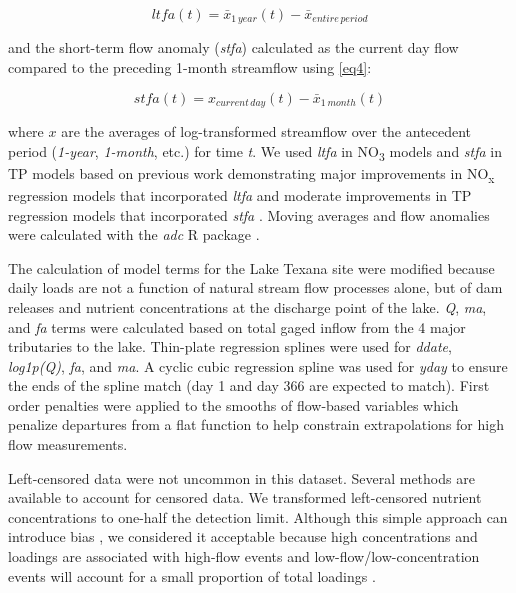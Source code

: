 \documentclass[sn-basic,referee,lineno,pdflatex]{sn-jnl}
\begin{document}
\begin{equation}
ltfa(t) = \bar{x}_{1\,year}(t) - \bar{x}_{entire\,period}
\label{eq3}
\end{equation}

and the short-term flow anomaly (\emph{stfa}) calculated as the current
day flow compared to the preceding 1-month streamflow using \ref{eq4}:

\begin{equation}
stfa(t) = x_{current\,day}(t) - \bar{x}_{1\,month}(t)
\label{eq4}
\end{equation}

where \(x\) are the averages of log-transformed streamflow over the
antecedent period (\emph{1-year}, \emph{1-month}, etc.) for time
\emph{t}. We used \emph{ltfa} in NO\textsubscript{3} models and
\emph{stfa} in TP models based on previous work demonstrating major
improvements in NO\textsubscript{x} regression models that incorporated
\emph{ltfa} and moderate improvements in TP regression models that
incorporated \emph{stfa} \citep{zhang_improving_2017}. Moving averages
and flow anomalies were calculated with the \emph{adc} R package
\citep{schrammAdcCalculateAntecedant2023}.

The calculation of model terms for the Lake Texana site were modified
because daily loads are not a function of natural stream flow processes
alone, but of dam releases and nutrient concentrations at the discharge
point of the lake. \emph{Q}, \emph{ma}, and \emph{fa} terms were
calculated based on total gaged inflow from the 4 major tributaries to
the lake. Thin-plate regression splines were used for \emph{ddate},
\emph{log1p(Q)}, \emph{fa}, and \emph{ma}. A cyclic cubic regression
spline was used for \emph{yday} to ensure the ends of the spline match
(day 1 and day 366 are expected to match). First order penalties were
applied to the smooths of flow-based variables which penalize departures
from a flat function to help constrain extrapolations for high flow
measurements.

Left-censored data were not uncommon in this dataset. Several methods
are available to account for censored data. We transformed left-censored
nutrient concentrations to one-half the detection limit. Although this
simple approach can introduce bias
\citep{hornungEstimationAverageConcentration1990}, we considered it
acceptable because high concentrations and loadings are associated with
high-flow events and low-flow/low-concentration events will account for
a small proportion of total loadings \citep{mcdowell_implications_2021}.
\end{document}
